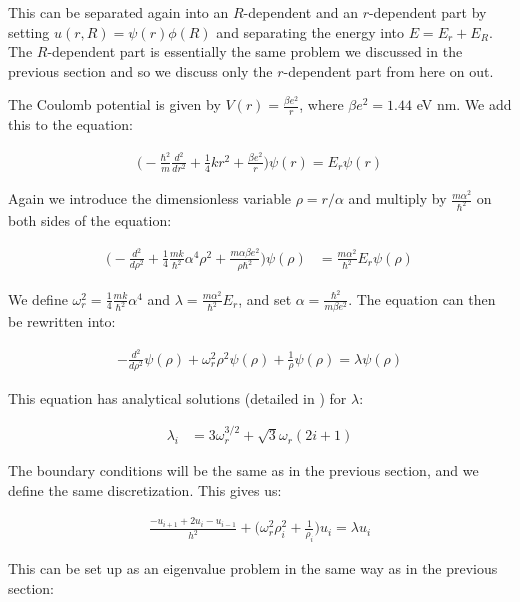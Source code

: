 \documentclass[reprint,english,notitlepage]{revtex4-1}  %
\begin{document}
This can be separated again into an $R$-dependent and an $r$-dependent part by setting $u(r,R) = \psi(r) \phi(R)$ and separating the energy into $E = E_r + E_R$. The $R$-dependent part is essentially the same problem we discussed in the previous section and so we discuss only the $r$-dependent part from here on out.

The Coulomb potential is given by $V(r) = \frac{\beta e^2}{r}$, where $\beta e^2 = 1.44$ eV nm. We add this to the equation:

\begin{align*}
\bigg( - \frac{\hbar^2}{m} \frac{d^2}{dr^2} + \frac{1}{4}kr^2 + \frac{\beta e^2}{r} \bigg) \psi(r) = E_r \psi(r)
\end{align*}

Again we introduce the dimensionless variable $\rho = r/\alpha$ and multiply by $\frac{m\alpha^2}{\hbar^2}$ on both sides of the equation:

\begin{align*}
\bigg( - \frac{d^2}{d\rho^2} + \frac{1}{4} \frac{mk}{\hbar^2} \alpha^4 \rho^2 + \frac{m\alpha \beta e^2}{\rho \hbar^2} \bigg) \psi (\rho) &= \frac{m\alpha^2}{\hbar^2} E_r \psi(\rho)
\end{align*} 

We define $\omega_r^2 = \frac{1}{4} \frac{mk}{\hbar^2} \alpha^4$ and $\lambda = \frac{m\alpha^2}{\hbar^2}E_r$, and set $\alpha = \frac{\hbar^2}{m\beta e^2}$. The equation can then be rewritten into:

\begin{align*}
- \frac{d^2}{d\rho^2} \psi(\rho) + \omega_r^2 \rho^2 \psi(\rho) + \frac{1}{\rho} \psi(\rho) = \lambda \psi(\rho)
\end{align*}

This equation has analytical solutions (detailed in \citep{PhysRevA.48.3561}) for $\lambda$:

\begin{align*}
\lambda_i &= 3 \omega_r^{3/2} +\sqrt{3} \omega_r (2i + 1)
\end{align*}

The boundary conditions will be the same as in the previous section, and we define the same discretization. This gives us:

\begin{align*}
\frac{-u_{i+1} + 2u_i - u_{i-1}}{h^2} + \bigg( \omega_r^2\rho_i^2 + \frac{1}{\rho_i} \bigg) u_i = \lambda u_i 
\end{align*}

This can be set up as an eigenvalue problem in the same way as in the previous section:
\end{document}
